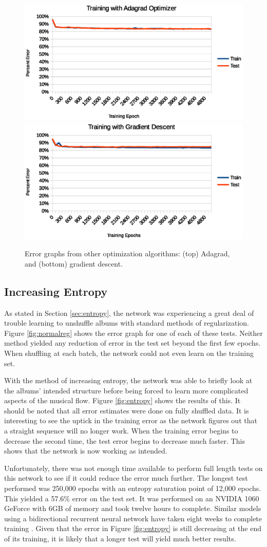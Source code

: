 \documentclass{article}
\begin{document}
\begin{figure}
\includegraphics[width=.5\textwidth]{Adagrad.eps}
\includegraphics[width=.5\textwidth]{Gradient-Descent.eps}
\caption{Error graphs from other optimization algorithms: (top) Adagrad, and (bottom) gradient descent.}
\label{fig:optimizers}
\end{figure}
\subsection{Increasing Entropy}
As stated in Section \ref{sec:entropy}, the network was experiencing a great deal of trouble learning to unshuffle albums with standard methods of regularization. Figure \ref{fig:normalreg} shows the error graph for one of each of these tests. Neither method yielded any reduction of error in the test set beyond the first few epochs. When shuffling at each batch, the network could not even learn on the training set.

With the method of increasing entropy, the network was able to briefly look at the albums' intended structure before being forced to learn more complicated aspects of the musical flow. Figure \ref{fig:entropy} shows the results of this. It should be noted that all error estimates were done on fully shuffled data. It is interesting to see the uptick in the training error as the network figures out that a straight sequence will no longer work. When the training error begins to decrease the second time, the test error begins to decrease much faster. This shows that the network is now working as intended.

Unfortunately, there was not enough time available to perform full length tests on this network to see if it could reduce the error much further. The longest test performed was 250,000 epochs with an entropy saturation point of 12,000 epochs. This yielded a 57.6\% error on the test set. It was performed on an NVIDIA 1060 GeForce with 6GB of memory and took twelve hours to complete. Similar models using a bidirectional recurrent neural network have taken eight weeks to complete training \cite{NIPS2015_5651}. Given that the error in Figure \ref{fig:entropy} is still decreasing at the end of its training, it is likely that a longer test will yield much better results.
\end{document}
